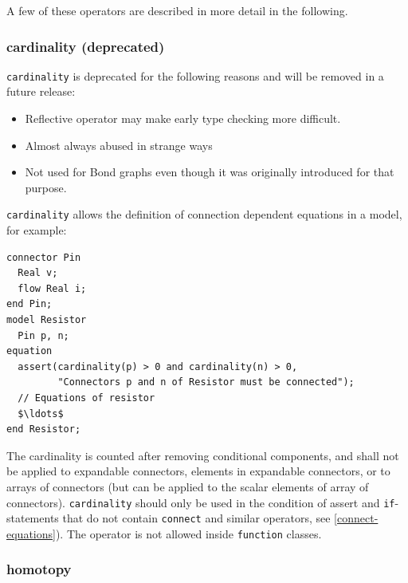 A few of these operators are described in more detail in the following.


\subsubsection{cardinality (deprecated)}\label{cardinality-deprecated}

\begin{nonnormative}
\lstinline!cardinality! is deprecated for the following reasons and will be removed in a future release:
\begin{itemize}
\item
  Reflective operator may make early type checking more difficult.
\item
  Almost always abused in strange ways
\item
  Not used for Bond graphs even though it was originally introduced for that purpose.
\end{itemize}
\end{nonnormative}

\begin{nonnormative}
\lstinline!cardinality! allows the definition of connection dependent equations in a model, for example:
\begin{lstlisting}[language=modelica]
connector Pin
  Real v;
  flow Real i;
end Pin;
model Resistor
  Pin p, n;
equation
  assert(cardinality(p) > 0 and cardinality(n) > 0,
         "Connectors p and n of Resistor must be connected");
  // Equations of resistor
  $\ldots$
end Resistor;
\end{lstlisting}
\end{nonnormative}

The cardinality is counted after removing conditional components, and shall not be applied to expandable connectors, elements in expandable connectors, or to arrays of connectors (but can be applied to the scalar elements of array of connectors).
\lstinline!cardinality! should only be used in the condition of assert and \lstinline!if!-statements that do not contain \lstinline!connect! and similar operators, see \cref{connect-equations}).
The operator is not allowed inside \lstinline!function! classes.


\subsubsection{homotopy}\label{homotopy}

